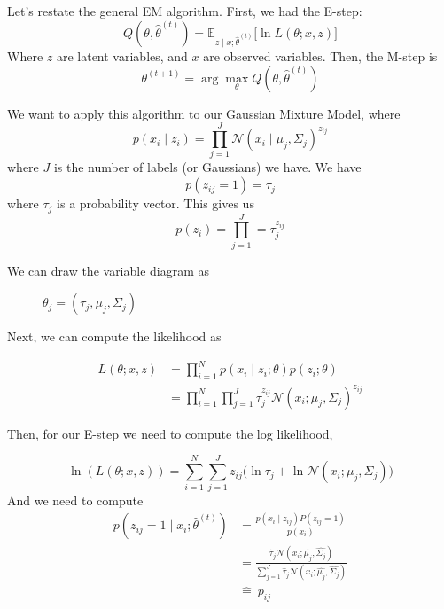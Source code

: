 \documentclass[]{article}
\title{}
\author{}
\newcommand{\thetahat}{\hat{\theta}^{(t)}}
\begin{document}
\maketitle


Let's restate the general EM algorithm. First, we had the E-step:
$$Q(\theta, \thetahat) = \mathbb{E}_{z \mid x; \thetahat}
\big[\ln L(\theta; x,z)\big]$$
Where $z$ are latent variables, and $x$ are observed variables. Then, the M-step is
$$\theta^{(t+1)} = \arg\max_{\theta} Q(\theta, \thetahat)$$

We want to apply this algorithm to our Gaussian Mixture Model, where
$$p(x_i \mid z_i) = \prod_{j=1}^{J} \mathcal{N}(x_i \mid \mu_j, \Sigma_j)^{z_{ij}}$$
where $J$ is the number of labels (or Gaussians) we have. We have
$$p(z_{ij} = 1) = \tau_{j}$$
where $\tau_j$ is a probability vector. This gives us 
$$p(z_{i}) = \prod_{j=1}^J = \tau_j^{z_{ij}}$$


We can draw the variable diagram as
\begin{figure}[H]
\centering
{}
\caption{$\theta_j = (\tau_j, \mu_j, \Sigma_j)$}
\end{figure}

Next, we can compute the likelihood as

\begin{align*}
L(\theta; x,z) &= \prod_{i=1}^N p(x_i \mid z_i; \theta)p(z_i;\theta)\\
&= \prod_{i=1}^N\prod_{j=1}^J \tau_j^{z_{ij}} \mathcal{N}(x_i; \mu_j, \Sigma_j)^{z_{ij}}
\end{align*}

Then, for our E-step we need to compute the log likelihood,

$$\ln(L(\theta; x,z)) = \sum_{i=1}^N\sum_{j=1}^J z_{ij}\Big(\ln\tau_j + \ln \mathcal{N}(x_i; \mu_j, \Sigma_j)\Big)$$
And we need to compute
\begin{align*}
p(z_{ij} = 1 \mid x_i; \thetahat) &= \frac{p(x_i \mid z_{ij})P(z_{ij} = 1)}{p(x_i)}\\
&= \frac{\hat{\tau}_j \mathcal{N}(x_i; \hat{\mu_j}, \hat{\Sigma_j})}{\sum_{j=1}^{J} \hat{\tau}_j \mathcal{N}(x_i; \hat{\mu_j}, \hat{\Sigma_j})}\\
&\hat{=}~ p_{ij}
\end{align*}
\end{document}
